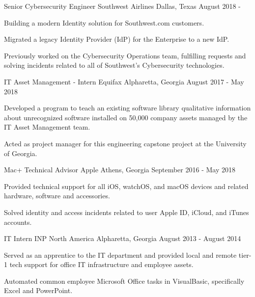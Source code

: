\begin{cventries}
  \cventry
    {Senior Cybersecurity Engineer}
    {Southwest Airlines}
    {Dallas, Texas}
    {August 2018 - }
    {
      \begin{cvitems}
        \item {Building a modern Identity solution for Southwest.com customers.}
        \item {Migrated a legacy Identity Provider (IdP) for the Enterprise to a new IdP.}
        \item {Previously worked on the Cybersecurity Operations team, fulfilling requests and solving incidents related to all of Southwest's
        Cybersecurity technologies.}
      \end{cvitems}
    }
  \cventry
    {IT Asset Management - Intern}
    {Equifax}
    {Alpharetta, Georgia}
    {August 2017 - May 2018}
    {
      \begin{cvitems}
        \item {Developed a program to teach an existing software library qualitative information about unrecognized software installed on 50,000 company assets managed by the IT Asset Management team.}
        \item {Acted as project manager for this engineering capstone project at the University of Georgia.}
      \end{cvitems}
    }
  \cventry
    {Mac+ Technical Advisor}
    {Apple}
    {Athens, Georgia}
    {September 2016 - May 2018}
    {
      \begin{cvitems}
        \item {Provided technical support for all iOS, watchOS, and macOS devices and related hardware, software and accessories.}
        \item {Solved identity and access incidents related to user Apple ID, iCloud, and iTunes accounts.}
      \end{cvitems}
    }
  \cventry
    {IT Intern}
    {INP North America}
    {Alpharetta, Georgia}
    {August 2013 - August 2014}
    {
      \begin{cvitems}
        \item Served as an apprentice to the IT department and provided local and remote tier-1 tech support for office IT infrastructure and employee assets.
        \item Automated common employee Microsoft Office tasks in VisualBasic, specifically Excel and PowerPoint.
      \end{cvitems}
    }
\end{cventries}
